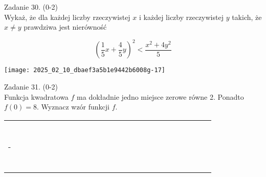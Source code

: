 \documentclass[10pt]{article}
\begin{document}
Zadanie 30. (0-2)\\
Wykaż, że dla każdej liczby rzeczywistej \(x\) i każdej liczby rzeczywistej \(y\) takich, że \(x \neq y\) prawdziwa jest nierówność

\[
\left(\frac{1}{5} x+\frac{4}{5} y\right)^{2}<\frac{x^{2}+4 y^{2}}{5}
\]

\begin{center}
\texttt{[image: 2025\_02\_10\_dbaef3a5b1e9442b6008g-17]}
\end{center}

Zadanie 31. (0-2)\\
Funkcja kwadratowa \(f\) ma dokładnie jedno miejsce zerowe równe 2. Ponadto \(f(0)=8\). Wyznacz wzór funkcji \(f\).

\begin{center}
\begin{tabular}{|c|c|c|c|c|c|c|c|c|c|c|c|c|c|c|c|c|c|c|c|c|c|c|c|c|}
\hline
 &  &  &  &  &  &  &  &  &  &  &  &  &  &  &  &  &  &  &  &  &  &  &  &  \\
\hline
 &  &  &  &  &  &  &  &  &  &  &  &  &  &  &  &  &  &  &  &  &  &  &  &  \\
\hline
 &  &  &  &  &  &  &  &  &  &  &  &  &  &  &  &  &  &  &  &  &  &  &  &  \\
\hline
 &  &  &  &  &  &  &  &  &  &  &  &  &  &  &  &  &  &  &  &  &  &  &  &  \\
\hline
 &  &  &  &  &  &  &  &  &  &  &  &  &  &  &  &  &  &  &  &  &  &  &  &  \\
\hline
 &  &  &  &  &  &  &  &  &  &  &  &  &  &  &  &  &  &  &  &  &  &  &  &  \\
\hline
 &  &  &  &  &  &  &  &  &  &  &  &  &  &  &  &  &  &  &  &  &  &  &  &  \\
\hline
- &  &  &  &  &  &  &  &  &  &  &  &  &  &  &  &  &  &  &  &  &  &  &  &  \\
\hline
 &  &  &  &  &  &  &  &  &  &  &  &  &  &  &  &  &  &  &  &  &  &  &  &  \\
\hline
 &  &  &  &  &  &  &  &  &  &  &  &  &  &  &  &  &  &  &  &  &  &  &  &  \\
\hline
 &  &  &  &  &  &  &  &  &  &  &  &  &  &  &  &  &  &  &  &  &  &  &  &  \\
\hline
 &  &  &  &  &  &  &  &  &  &  &  &  &  &  &  &  &  &  &  &  &  &  &  &  \\
\hline
 &  &  &  &  &  &  &  &  &  &  &  &  &  &  &  &  &  &  &  &  &  &  &  &  \\
\hline
 &  &  &  &  &  &  &  &  &  &  &  &  &  &  &  &  &  &  &  &  &  &  &  &  \\

\end{tabular}
\end{center}
\end{document}
